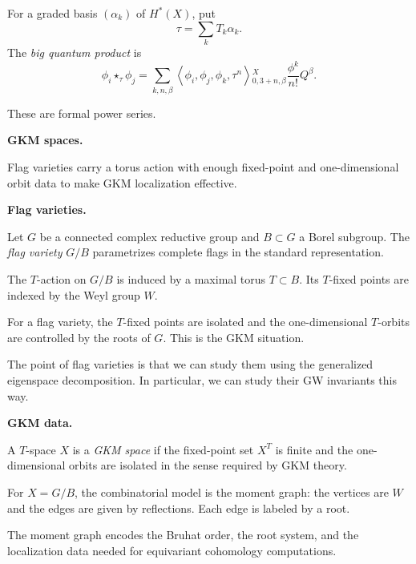\begin{definition}
\label{definition-graded-basis}
For a graded basis
$(\alpha_k)$ of $H^*(X)$, put
\[
\tau=\sum_k T_k\alpha_k.
\]
The {\it big quantum product} is
\[
\phi_i\star_\tau\phi_j
=
\sum_{k,n,\beta}
\left\langle{}
\phi_i,\phi_j,\phi_k,\tau^n
\right\rangle{}^X_{0,3+n,\beta}
\frac{\phi^k}{n!}Q^\beta.
\]
\end{definition}

These are formal power series.

\medskip\noindent
{\bf GKM spaces.}

Flag varieties carry a torus action with
enough fixed-point and one-dimensional
orbit data to make GKM localization
effective.

\medskip\noindent
{\bf Flag varieties.}

\begin{definition}
\label{definition-let-g}
Let $G$ be a connected complex reductive
group and $B\subset G$ a Borel subgroup.
The {\it flag variety} $G/B$
parametrizes
complete flags in the standard
representation.
\end{definition}

The $T$-action on $G/B$ is induced by a
maximal torus $T\subset B$.
Its $T$-fixed points are indexed by the
Weyl group $W$.

\begin{remark}
\label{remark-flag-variety}
For a flag variety, the $T$-fixed points
are isolated and the one-dimensional
$T$-orbits are controlled by the roots of
$G$.
This is the GKM situation.
\end{remark}

The point of flag varieties is that we
can study them using the generalized
eigenspace decomposition.
In particular, we can study their
GW invariants this way.

\medskip\noindent
{\bf GKM data.}

\begin{definition}
\label{definition-t-space}
A $T$-space $X$ is a {\it GKM space}
if the fixed-point set $X^T$ is finite
and the one-dimensional orbits are
isolated in the sense required by GKM
theory.
\end{definition}

For $X=G/B$, the combinatorial model is
the moment graph:
the vertices are $W$ and the edges are
given by reflections.
Each edge is labeled by a root.

\begin{remark}
\label{remark-moment-graph}
The moment graph encodes the Bruhat
order, the root system, and the
localization data needed for equivariant
cohomology computations.
\end{remark}

